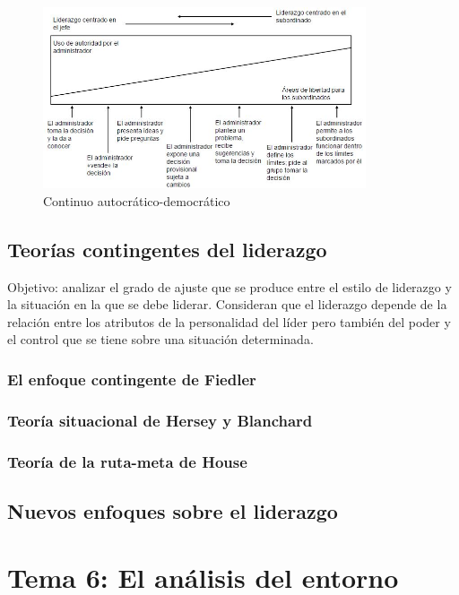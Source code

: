 \documentclass[12pt]{article}
\theoremstyle{definition_wo_parentheses}
\begin{document}
\begin{figure}[H]
\centering
\includegraphics[width=0.85\textwidth]{continuo}
\caption{Continuo autocrático-democrático}
\label{fig:continuo}
\end{figure}

\subsection{Teorías contingentes del liderazgo}
Objetivo: analizar el grado de ajuste que se produce entre el estilo de liderazgo y la situación en la que se debe liderar. Consideran que el liderazgo depende de la relación entre los atributos de la personalidad del líder pero también del poder y el control que se tiene sobre una situación determinada.

\subsubsection{El enfoque contingente de Fiedler}
\subsubsection{Teoría situacional de Hersey y Blanchard}
\subsubsection{Teoría de la ruta-meta de House}

\subsection{Nuevos enfoques sobre el liderazgo}


\section{Tema 6: El análisis del entorno}
\end{document}

